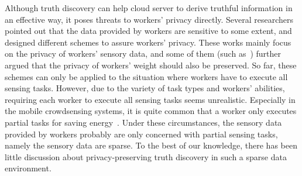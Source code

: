 \documentclass[conference]{IEEEtran}
\begin{document}
Although truth discovery can help cloud server to derive truthful information in an effective way, it poses threats to workers' privacy directly.
Several researchers~\cite{miao_cloud-enabled_2015,xu_efficient_2019,miao_lightweight_2017,zhang_reliable_2019,xue_inpptd_2020,tang_achieving_2021} pointed out that the data provided by workers are sensitive to some extent, and designed different schemes to assure workers' privacy.
These works mainly focus on the privacy of workers' sensory data, and some of them (such as~\cite{zhang_reliable_2019,xue_inpptd_2020,tang_achieving_2021}) further argued that the privacy of workers' weight should also be preserved.
So far, these schemes can only be applied to the situation where workers have to execute all sensing tasks.
However, due to the variety of task types and workers' abilities, requiring each worker to execute all sensing tasks seems unrealistic.
Especially in the mobile crowdsensing systems, it is quite common that a worker only executes partial tasks for saving energy~\cite{wang_sparse_2016,wang_energy_2018}.
Under these circumstances, the sensory data provided by workers probably are only concerned with partial sensing tasks, namely the sensory data are sparse.
To the best of our knowledge, there has been little discussion about privacy-preserving truth discovery in such a sparse data environment.
\end{document}
